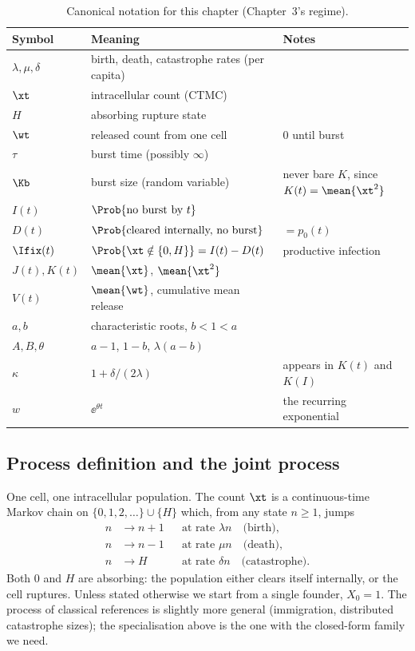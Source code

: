 \begin{table}[H]
\centering
\renewcommand{\arraystretch}{1.25}
\small
\begin{tabular}{@{}llp{}@{}}
\toprule
Symbol & Meaning & Notes \\
\midrule
$\lambda,\mu,\delta$ & birth, death, catastrophe rates (per capita) & \\
$\xt$ & intracellular count (CTMC) & \\
$H$ & absorbing rupture state & \\
$\wt$ & released count from one cell & $0$ until burst \\
$\tau$ & burst time (possibly $\infty$) & \\
$\Kb$ & burst size (random variable) & never bare $K$, since $K(t)=\mean{\xt^2}$ \\
$I(t)$ & $\Prob{\text{no burst by }t}$ & \\
$D(t)$ & $\Prob{\text{cleared internally, no burst}}$ & $= p_0(t)$ \\
$\Ifix(t)$ & $\Prob{\xt\notin\{0,H\}} = I(t)-D(t)$ & productive infection \\
$J(t),K(t)$ & $\mean{\xt}$, $\mean{\xt^2}$ & \\
$V(t)$ & $\mean{\wt}$, cumulative mean release & \\
$a,b$ & characteristic roots, $b<1<a$ & \\
$A,B,\theta$ & $a-1$, $1-b$, $\lambda(a-b)$ & \\
$\kappa$ & $1+\delta/(2\lambda)$ & appears in $K(t)$ and $K(I)$ \\
$w$ & $\ee^{\theta t}$ & the recurring exponential \\
\bottomrule
\end{tabular}
\caption{Canonical notation for this chapter (Chapter~3's regime).}
\label{tab:notation}
\end{table}

\subsection{Process definition and the joint process}

One cell, one intracellular population. The count $\xt$ is a continuous-time
Markov chain on $\{0,1,2,\ldots\}\cup\{H\}$ which, from any state $n\ge1$,
jumps
\begin{align*}
n &\to n+1 &&\text{at rate } \lambda n \quad\text{(birth)},\\
n &\to n-1 &&\text{at rate } \mu n \quad\text{(death)},\\
n &\to H &&\text{at rate } \delta n \quad\text{(catastrophe)}.
\end{align*}
Both $0$ and $H$ are absorbing: the population either clears itself
internally, or the cell ruptures. Unless stated otherwise we start from a
single founder, $X_0=1$. The process of classical references
\cite{brockwell1982birth,karlin1982linear,di2008note} is slightly more
general (immigration, distributed catastrophe sizes); the specialisation
above is the one with the closed-form family we need.

